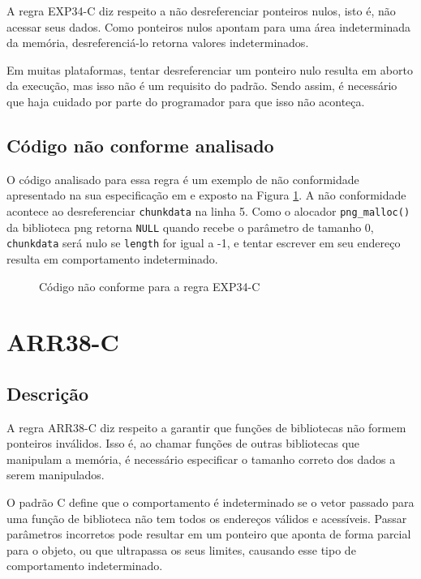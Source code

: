 A regra EXP34-C diz respeito a não desreferenciar ponteiros nulos, isto é, não acessar seus dados. Como ponteiros nulos apontam para uma área indeterminada da memória, desreferenciá-lo retorna valores indeterminados.

Em muitas plataformas, tentar desreferenciar um ponteiro nulo resulta em aborto da execução, mas isso não é um requisito do padrão. Sendo assim, é necessário que haja cuidado por parte do programador para que isso não aconteça.

\subsection{Código não conforme analisado}

O código analisado para essa regra é um exemplo de não conformidade apresentado na sua especificação em \cite{ccert} e exposto na Figura \ref{fig:EXP34-C}. A não conformidade acontece ao desreferenciar \texttt{chunkdata} na linha 5. Como o alocador \texttt{png\_malloc()} da biblioteca png retorna \texttt{NULL} quando recebe o parâmetro de tamanho 0, \texttt{chunkdata} será nulo se \texttt{length} for igual a -1, e tentar escrever em seu endereço resulta em comportamento indeterminado.

\begin{figure}[h!]
  \centering
  
  \caption{Código não conforme para a regra EXP34-C}
\label{fig:EXP34-C}
\end{figure}

\section{ARR38-C}
\subsection{Descrição}

A regra ARR38-C diz respeito a garantir que funções de bibliotecas não formem ponteiros inválidos. Isso é, ao chamar funções de outras bibliotecas que manipulam a memória, é necessário especificar o tamanho correto dos dados a serem manipulados.

O padrão C \cite{ISO-C} define que o comportamento é indeterminado se o vetor passado para uma função de biblioteca não tem todos os endereços válidos e acessíveis. Passar parâmetros incorretos pode resultar em um ponteiro que aponta de forma parcial para o objeto, ou que ultrapassa os seus limites, causando esse tipo de comportamento indeterminado.

